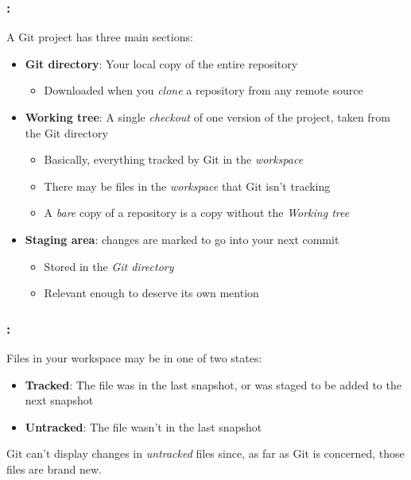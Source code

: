\begin{frame}
    \frametitle{\secname: \small\subsecname\normalsize}

    A Git project has three main sections:

    \begin{itemize}
        \item \textbf{Git directory}: Your local copy of the entire repository
        \begin{itemize}
            \item Downloaded when you \textit{clone} a repository from any remote source
        \end{itemize}
        \item \textbf{Working tree}: A single \textit{checkout} of one version of the project, taken from the Git directory
        \begin{itemize}
            \item Basically, everything tracked by Git in the \textit{workspace}
            \item There may be files in the \textit{workspace} that Git isn't tracking
            \item A \textit{bare} copy of a repository is a copy without the \textit{Working tree}
        \end{itemize}
        \item \textbf{Staging area}: changes are marked to go into your next commit
        \begin{itemize}
            \item Stored in the \textit{Git directory}
            \item Relevant enough to deserve its own mention
        \end{itemize}
    \end{itemize}
\end{frame}

\begin{frame}
    \frametitle{\secname: \small\subsecname\normalsize}

    Files in your workspace may be in one of two states:

    \begin{itemize}
        \item \textbf{Tracked}: The file was in the last snapshot, or was staged to be added to the next snapshot
        \item \textbf{Untracked}: The file wasn't in the last snapshot
    \end{itemize}

    Git can't display changes in \textit{untracked}  files since, as far as Git is concerned, those files are brand new.
\end{frame}

